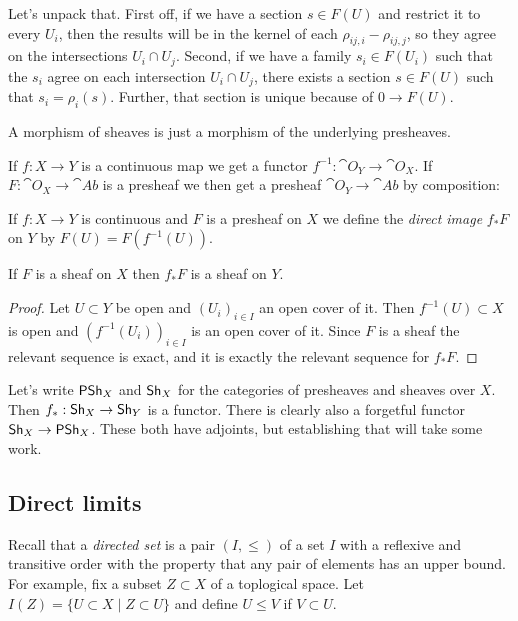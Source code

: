 Let's unpack that.
First off, if we have a section $s \in F(U)$ and restrict it to every $U_i$, then the results will be in the kernel of each $\rho_{ij,i} - \rho_{ij,j}$, so they agree on the intersections $U_i \cap U_j$.
Second, if we have a family $s_i \in F(U_i)$ such that the $s_i$ agree on each intersection $U_i \cap U_j$, there exists a section $s \in F(U)$ such that $s_i = \rho_i(s)$.
Further, that section is unique because of $0 \to F(U)$.

A morphism of sheaves is just a morphism of the underlying presheaves.


If $f : X \to Y$ is a continuous map we get a functor $f^{-1}: \cat O_Y \to \cat O_X$.
If $F : \cat O_X \to \cat{Ab}$ is a presheaf we then get a presheaf $\cat O_Y \to \cat{Ab}$ by composition:

\begin{defi}
If $f : X \to Y$ is continuous and $F$ is a presheaf on $X$ we define the \emph{direct image} $f_*F$ on $Y$ by $F(U) = F(f^{-1}(U))$.
\end{defi}


\begin{prop}
If $F$ is a sheaf on $X$ then $f_* F$ is a sheaf on $Y$.
\end{prop}

\begin{proof}
Let $U \subset Y$ be open and $(U_i)_{i \in I}$ an open cover of it.
Then $f^{-1}(U) \subset X$ is open and $(f^{-1}(U_i))_{i \in I}$ is an open cover of it.
Since $F$ is a sheaf the relevant sequence is exact, and it is exactly the relevant sequence for $f_*F$.
\end{proof}


Let's write $\mathsf{PSh}_X$ and $\mathsf{Sh}_X$ for the categories of presheaves and sheaves over $X$.
Then $f_* : \mathsf{Sh}_X \to \mathsf{Sh}_Y$ is a functor.
There is clearly also a forgetful functor $\mathsf{Sh}_X \to \mathsf{PSh}_X$.
These both have adjoints, but establishing that will take some work.


\subsection{Direct limits}

Recall that a \emph{directed set} is a pair $(I, \leq)$ of a set $I$ with a reflexive and transitive order with the property that any pair of elements has an upper bound.
For example, fix a subset $Z \subset X$ of a toplogical space.
Let $I(Z) = \{ U \subset X \mid Z \subset U \}$ and define $U \leq V$ if $V \subset U$.

